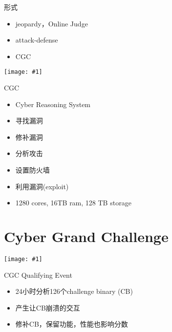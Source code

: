 \documentclass{beamer}
\newcommand{\image}[1]{
  \begin{frame}
    \texttt{[image: \#1]}
  \end{frame}
}
\begin{document}
\begin{frame}
  \begin{block}{形式}
    \begin{itemize}[<+-|alert@+>]
      \item jeopardy，Online Judge
      \item attack-defense
      \item CGC
    \end{itemize}
  \end{block}
\end{frame}

\image{img/a.jpg}

\begin{frame}
  \begin{block}{CGC}
    \begin{itemize}
      \item Cyber Reasoning System
      \item 寻找漏洞
      \item 修补漏洞
      \item 分析攻击
      \item 设置防火墙
      \item 利用漏洞(exploit)
      \item 1280 cores, 16TB ram, 128 TB storage
    \end{itemize}
  \end{block}
\end{frame}

\section{Cyber Grand Challenge}

\image{img/cgc-timeline.png}

\begin{frame}
  \begin{block}{CGC Qualifying Event}
    \begin{itemize}
      \item 24小时分析126个challenge binary (CB)
      \item 产生让CB崩溃的交互
      \item 修补CB，保留功能，性能也影响分数
    \end{itemize}
  \end{block}
\end{frame}
\end{document}
